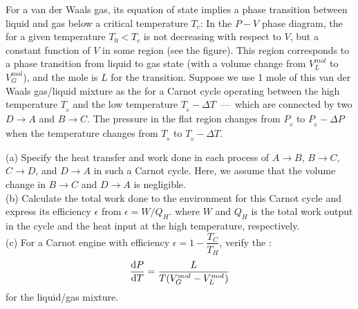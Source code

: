     \begin{example}
        For a van der Waals gas, its equation of state implies a phase transition between
        liquid and gas below a critical temperature $T_c$: In the $P-V$ phase
        diagram, the  for a given temperature $T_{0} < T_{c}$ is not 
        decreasing with respect to $V$, but a constant function of $V$ in some region (see the
        figure). This region corresponds to a phase transition from liquid to gas state (with a
        volume change from $V_{L}^{mol}$ to $V_{G}^{mol}$), and the mole  is $L$ for the transition.
        Suppose we use 1 mole of this van der Waals gas/liquid mixture as the  for
        a Carnot cycle operating between the high temperature $T_{_0}$ and the low temperature
        $T_{_0}-\Delta T$\ —\ which are connected by two  $D\rightarrow A$ and $B\rightarrow C$.
        The pressure in the flat region changes from $P_{_0}$ to $P_{_0}-\Delta P$ when the temperature
        changes from $T_{_0}$ to $T_{_0}-\Delta T$.

        (a) Specify the heat transfer and work done in each process of $A\rightarrow B$, $B\rightarrow C$,
        $C\rightarrow D$, and $D\rightarrow A$ in such a Carnot cycle. Here, we assume that the volume
        change in $B\rightarrow C$ and $D\rightarrow A$ is negligible.\\
        (b) Calculate the total work done to the environment for this Carnot cycle and express
        its efficiency $\epsilon$ from $\epsilon = W/Q_H$. where $W$ and $Q_H$ is the total work output in
        the cycle and the heat input at the high temperature, respectively.\\
        (c) For a Carnot engine with efficiency $\epsilon = 1-\dfrac{T_C}{T_H}$, verify the :
        \begin{equation*}
        	\frac{\dif{P}}{\dif{T}}=\frac{L}{T(V_{G}^{mol}-V_{L}^{mol})}
        \end{equation*}    
        for the liquid/gas mixture.
    \end{example}
